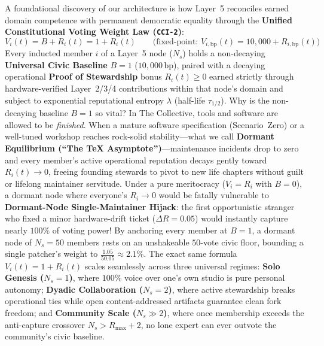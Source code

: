 A foundational discovery of our architecture is how Layer~5 reconciles earned domain competence with permanent democratic equality through the \textbf{Unified Constitutional Voting Weight Law (\texttt{CCI-2})}:
\[
V_i(t) = B + R_i(t) = 1 + R_i(t) \qquad \bigl(\text{fixed-point: } V_{i,\mathrm{bp}}(t) = 10{,}000 + R_{i,\mathrm{bp}}(t)\bigr)
\]
Every inducted member $i$ of a Layer~5 node ($N_s$) holds a non-decaying \textbf{Universal Civic Baseline} $B = 1$ ($10{,}000\,\mathrm{bp}$), paired with a decaying operational \textbf{Proof of Stewardship} bonus $R_i(t) \ge 0$ earned strictly through hardware-verified Layer~2/3/4 contributions within that node's domain and subject to exponential reputational entropy $\lambda$ (half-life $\tau_{1/2}$). Why is the non-decaying baseline $B = 1$ so vital? In The Collective, tools and software are allowed to be \textit{finished}. When a mature software specification (Scenario~Zero) or a well-tuned workshop reaches rock-solid stability---what we call \textbf{Dormant Equilibrium (``The \TeX{} Asymptote'')}---maintenance incidents drop to zero and every member's active operational reputation decays gently toward $R_i(t) \to 0$, freeing founding stewards to pivot to new life chapters without guilt or lifelong maintainer servitude. Under a pure meritocracy ($V_i = R_i$ with $B = 0$), a dormant node where everyone's $R_i \to 0$ would be fatally vulnerable to \textbf{Dormant-Node Single-Maintainer Hijack}: the first opportunistic stranger who fixed a minor hardware-drift ticket ($\Delta R = 0.05$) would instantly capture nearly $100\%$ of voting power! By anchoring every member at $B = 1$, a dormant node of $N_s = 50$ members rests on an unshakeable $50$-vote civic floor, bounding a single patcher's weight to $\frac{1.05}{50.05} \approx 2.1\%$. The exact same formula $V_i(t) = 1 + R_i(t)$ scales seamlessly across three universal regimes: \textbf{Solo Genesis ($N_s = 1$)}, where $100\%$ voice over one's own studio is pure personal autonomy; \textbf{Dyadic Collaboration ($N_s = 2$)}, where active stewardship breaks operational ties while open content-addressed artifacts guarantee clean fork freedom; and \textbf{Community Scale ($N_s \gg 2$)}, where once membership exceeds the anti-capture crossover $N_s > R_{\max} + 2$, no lone expert can ever outvote the community's civic baseline.

